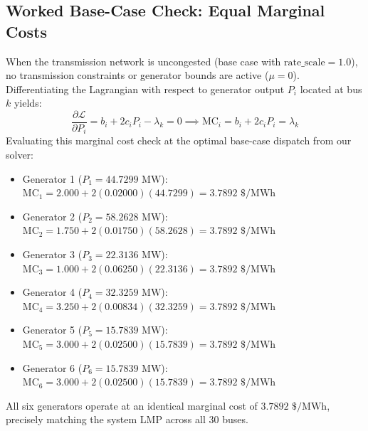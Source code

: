 \subsection{Worked Base-Case Check: Equal Marginal Costs}
When the transmission network is uncongested (base case with $\text{rate\_scale} = 1.0$), no transmission constraints or generator bounds are active ($\mu = 0$). Differentiating the Lagrangian with respect to generator output $P_i$ located at bus $k$ yields:
\begin{equation}
    \frac{\partial \mathcal{L}}{\partial P_i} = b_i + 2 c_i P_i - \lambda_k = 0 \implies \text{MC}_i = b_i + 2 c_i P_i = \lambda_k
\end{equation}
Evaluating this marginal cost check at the optimal base-case dispatch from our solver:
\begin{itemize}
    \item Generator 1 ($P_1 = 44.7299\text{ MW}$): $\text{MC}_1 = 2.000 + 2(0.02000)(44.7299) = 3.7892\text{ \$/MWh}$
    \item Generator 2 ($P_2 = 58.2628\text{ MW}$): $\text{MC}_2 = 1.750 + 2(0.01750)(58.2628) = 3.7892\text{ \$/MWh}$
    \item Generator 3 ($P_3 = 22.3136\text{ MW}$): $\text{MC}_3 = 1.000 + 2(0.06250)(22.3136) = 3.7892\text{ \$/MWh}$
    \item Generator 4 ($P_4 = 32.3259\text{ MW}$): $\text{MC}_4 = 3.250 + 2(0.00834)(32.3259) = 3.7892\text{ \$/MWh}$
    \item Generator 5 ($P_5 = 15.7839\text{ MW}$): $\text{MC}_5 = 3.000 + 2(0.02500)(15.7839) = 3.7892\text{ \$/MWh}$
    \item Generator 6 ($P_6 = 15.7839\text{ MW}$): $\text{MC}_6 = 3.000 + 2(0.02500)(15.7839) = 3.7892\text{ \$/MWh}$
\end{itemize}
All six generators operate at an identical marginal cost of $3.7892\text{ \$/MWh}$, precisely matching the system LMP across all 30 buses.
